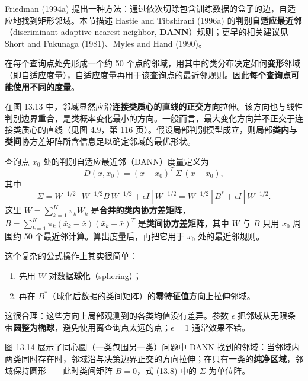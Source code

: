 \begin{remark}[发展脉络]
Friedman (1994a) 提出一种方法：通过依次切除包含训练数据的盒子的边，自适应地找到矩形邻域。本节描述 Hastie and Tibshirani (1996a) 的\textbf{判别自适应最近邻}（discriminant adaptive nearest-neighbor, \textbf{DANN}）规则；更早的相关建议见 Short and Fukunaga (1981)、Myles and Hand (1990)。

在每个查询点处先形成一个约 50 个点的邻域，用其中的类分布决定如何\textbf{变形}邻域（即自适应度量），自适应度量再用于该查询点的最近邻规则。因此\textbf{每个查询点可能使用不同的度量}。
\end{remark}

在图 13.13 中，邻域显然应沿\textbf{连接类质心的直线的正交方向}拉伸。该方向也与线性判别边界重合，是类概率变化最小的方向。一般而言，最大变化方向并不正交于连接类质心的直线（见图 4.9，第 116 页）。假设局部判别模型成立，则局部\textbf{类内}与\textbf{类间}协方差矩阵所含信息足以确定邻域的最优形状。

\begin{definition}[DANN 度量]
查询点 $x_0$ 处的判别自适应最近邻（DANN）度量定义为
\begin{equation}
D(x,x_0) = (x - x_0)^T\,\Sigma\,(x - x_0), \label{eq:13_8}
\end{equation}
其中
\begin{equation}
\Sigma = W^{-1/2}\left[W^{-1/2} B\, W^{-1/2} + \epsilon I\right]W^{-1/2}
      = W^{-1/2}\left[B^\ast + \epsilon I\right]W^{-1/2}. \label{eq:13_9}
\end{equation}
这里 $W = \sum_{k=1}^{K}\pi_k W_k$ 是\textbf{合并的类内协方差矩阵}，$B = \sum_{k=1}^{K}\pi_k(\bar{x}_k - \bar{x})(\bar{x}_k - \bar{x})^T$ 是\textbf{类间协方差矩阵}，其中 $W$ 与 $B$ 只用 $x_0$ 周围约 50 个最近邻计算。算出度量后，再把它用于 $x_0$ 处的最近邻规则。
\end{definition}

\begin{remark}[Σ 的操作理解]
这个复杂的公式操作上其实很简单：
\begin{enumerate}[itemsep=1pt]
\item 先用 $W$ 对数据\textbf{球化}（sphering）；
\item 再在 $B^\ast$（球化后数据的类间矩阵）的\textbf{零特征值方向}上拉伸邻域。
\end{enumerate}
这很合理：这些方向上局部观测到的各类均值没有差异。参数 $\epsilon$ 把邻域从无限条带\textbf{圆整为椭球}，避免使用离查询点太远的点；$\epsilon=1$ 通常效果不错。

图 13.14 展示了同心圆（一类包围另一类）问题中 DANN 找到的邻域：当邻域内两类同时存在时，邻域沿与决策边界正交的方向拉伸；在只有一类的\textbf{纯净区域}，邻域保持圆形——此时类间矩阵 $B=0$，式 (13.8) 中的 $\Sigma$ 为单位阵。
\end{remark}

